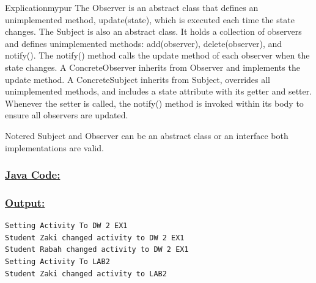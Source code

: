 \vspace{0.25cm}
\begin{prettyBox}{Explication}{mypur}
The Observer is an abstract class that defines an unimplemented method, update(state), which is executed each time the state changes.  
The Subject is also an abstract class. It holds a collection of observers and defines unimplemented methods: add(observer), delete(observer), and notify(). The notify() 
method calls the update method of each observer when the state changes.  
A ConcreteObserver inherits from Observer and implements the update method.  
A ConcreteSubject inherits from Subject, overrides all unimplemented methods, and includes a state attribute with its getter and setter.  
Whenever the setter is called, the notify() method is invoked within its body to ensure all observers are updated.
\end{prettyBox}

\vspace{0.25cm}
\begin{prettyBox}{Note}{red}
Subject and Observer can be an abstract class or an interface both implementations are valid.
\end{prettyBox}

\newpage
\subsubsection*{\underline{Java Code:}}



\vspace{0.25cm}


\vspace{0.25cm}

\newpage


\vspace{0.5cm}

\newpage

\subsubsection*{\underline{Output:}}
\begin{lstlisting}[style=cmd]
Setting Activity To DW 2 EX1
Student Zaki changed activity to DW 2 EX1
Student Rabah changed activity to DW 2 EX1
Setting Activity To LAB2
Student Zaki changed activity to LAB2
\end{lstlisting}
\vspace{0.5cm}

